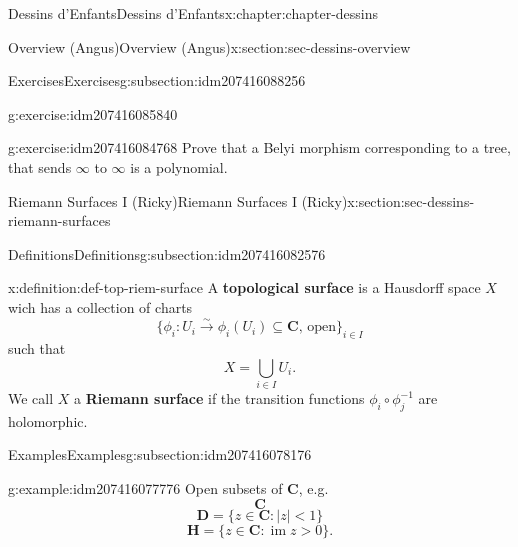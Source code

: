 \documentclass[oneside,10pt,]{book}
\newcommand{\terminology}[1]{\textbf{#1}}
\numberwithin{equation}{section}
\newcommand{\CC}{\mathbf{C}}
\newcommand{\HH}{\mathbf{H}}
\DeclareMathOperator{\im}{im}
\newcommand{\lt}{<}
\newcommand{\gt}{>}
\begin{document}
\begin{chapterptx}{Dessins d'Enfants}{}{Dessins d'Enfants}{}{}{x:chapter:chapter-dessins}
\begin{sectionptx}{Overview (Angus)}{}{Overview (Angus)}{}{}{x:section:sec-dessins-overview}
\begin{subsectionptx}{Exercises}{}{Exercises}{}{}{g:subsection:idm207416088256}
\begin{inlineexercise}{}{g:exercise:idm207416085840}
\end{inlineexercise}
\begin{inlineexercise}{}{g:exercise:idm207416084768}%
Prove that a Belyi morphism corresponding to a tree, that sends \(\infty\) to \(\infty\) is a polynomial.%
\end{inlineexercise}
\end{subsectionptx}
\end{sectionptx}
%
%
\typeout{************************************************}
\typeout{************************************************}
%
\begin{sectionptx}{Riemann Surfaces I (Ricky)}{}{Riemann Surfaces I (Ricky)}{}{}{x:section:sec-dessins-riemann-surfaces}
%
%
\typeout{************************************************}
\typeout{************************************************}
%
\begin{subsectionptx}{Definitions}{}{Definitions}{}{}{g:subsection:idm207416082576}
\begin{definition}{}{x:definition:def-top-riem-surface}%
A \terminology{topological surface} is a Hausdorff space \(X\) wich has a collection of charts%
\begin{equation*}
\{\phi_i \colon U_i \xrightarrow\sim \phi_i(U_i) \subseteq \CC,\,\text{open}\}_{i\in I}
\end{equation*}
such that%
\begin{equation*}
X= \bigcup_{i\in I} U_i\text{.}
\end{equation*}
We call \(X\) a \terminology{Riemann surface} if the transition functions \(\phi_i\circ \phi_j^{-1}\) are holomorphic.%
\end{definition}
\end{subsectionptx}
%
%
\typeout{************************************************}
\typeout{************************************************}
%
\begin{subsectionptx}{Examples}{}{Examples}{}{}{g:subsection:idm207416078176}
\begin{example}{}{g:example:idm207416077776}%
Open subsets of \(\CC\), e.g.%
\begin{equation*}
\CC
\end{equation*}
%
\begin{equation*}
\mathbf D = \{z\in \CC : |z| \lt 1 \}
\end{equation*}
%
\begin{equation*}
\HH = \{z\in \CC : \im z \gt 0 \}\text{.}

\end{equation*}
\end{example}
\end{subsectionptx}
\end{sectionptx}
\end{chapterptx}
\end{document}
